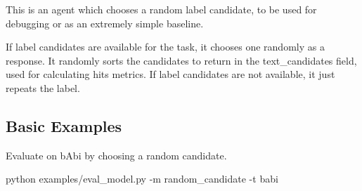 This is an agent which chooses a random label candidate, to be used for debugging or as an extremely simple baseline.

If label candidates are available for the task, it chooses one randomly as a response. It randomly sorts the candidates to return in the {\ttfamily text\+\_\+candidates} field, used for calculating hits metrics. If label candidates are not available, it just repeats the label.

\subsection*{Basic Examples}

Evaluate on b\+Abi by choosing a random candidate. 
\begin{DoxyCode}
python examples/eval\_model.py -m random\_candidate -t babi
\end{DoxyCode}
 